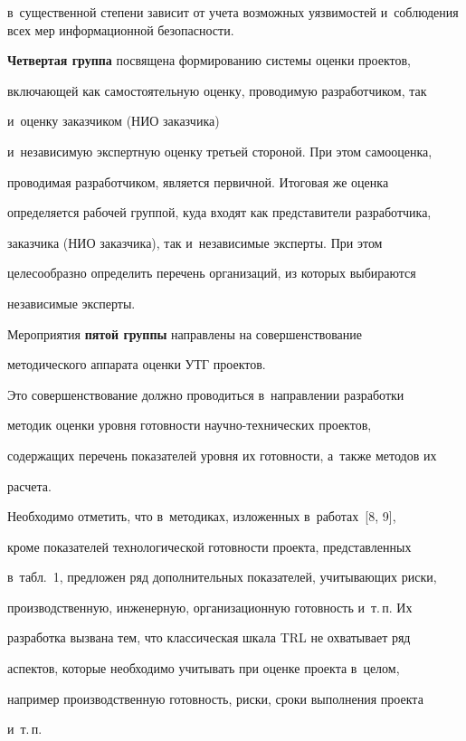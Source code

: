 в~существенной степени зависит от учета возможных уязвимостей и~соблюдения всех мер информационной безопас\-ности.

  

  \textbf{Четвертая группа} посвящена формированию системы оценки проектов, 

включающей как самостоятельную оценку, проводимую разработчиком, так 

и~оценку заказчиком (НИО заказчика) 

и~независимую экспертную оценку треть\-ей стороной. При этом самооценка, 

проводимая разработчиком, является первичной. Итоговая же оценка 

определяется рабочей группой, куда входят как представители разработчика, 

заказчика (НИО заказчика), так и~независимые эксперты. При этом 

целесообразно определить перечень организаций, из которых выбираются 

независимые эксперты.

  

  Мероприятия \textbf{пятой группы} направлены на совершенствование 

методического аппарата оценки УТГ проектов. 

Это совершенствование должно проводиться в~направлении разработки 

методик оценки уровня готовности на\-уч\-но-тех\-ни\-че\-ских проектов, 

содержащих перечень показателей уровня их готовности, а~также методов их 

расчета.

  

  Необходимо отметить, что в~методиках, изложенных в~работах~[8, 9], 

кроме показателей технологической готовности проекта, представленных 

в~табл.~1, предложен ряд дополнительных показателей, учитывающих риски, 

производственную, инженерную, организационную готовность и~т.\,п. Их 

разработка вызвана тем, что классическая шкала TRL не охватывает ряд 

аспектов, которые необходимо учитывать при оценке проекта в~целом, 

например производственную готовность, риски, сроки выполнения проекта 

и~т.\,п.

